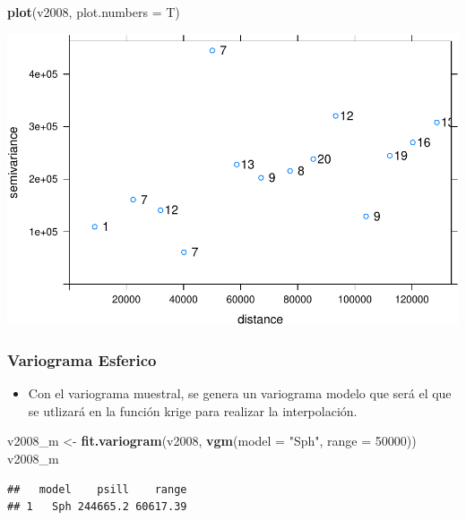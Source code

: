 \documentclass[11pt,]{article}
\newenvironment{Shaded}{\begin{snugshade}}{\end{snugshade}}
\newcommand{\KeywordTok}[1]{\textcolor[rgb]{0.13,0.29,0.53}{\textbf{#1}}}
\newcommand{\DataTypeTok}[1]{\textcolor[rgb]{0.13,0.29,0.53}{#1}}
\newcommand{\DecValTok}[1]{\textcolor[rgb]{0.00,0.00,0.81}{#1}}
\newcommand{\StringTok}[1]{\textcolor[rgb]{0.31,0.60,0.02}{#1}}
\newcommand{\NormalTok}[1]{#1}
\providecommand{\tightlist}{%
\setlength{\itemsep}{0pt}\setlength{\parskip}{0pt}}
\begin{document}
\begin{Shaded}
\begin{Highlighting}[]
\KeywordTok{plot}\NormalTok{(v2008, }\DataTypeTok{plot.numbers =}\NormalTok{ T)}
\end{Highlighting}
\end{Shaded}

\includegraphics{proyecto_files/figure-latex/unnamed-chunk-31-1.pdf}

\subsubsection{Variograma Esferico}\label{variograma-esferico}

\begin{itemize}
\tightlist
\item
  Con el variograma muestral, se genera un variograma modelo que será el
  que se utlizará en la función krige para realizar la interpolación.
\end{itemize}

\begin{Shaded}
\begin{Highlighting}[]
\NormalTok{v2008_m <-}\StringTok{ }\KeywordTok{fit.variogram}\NormalTok{(v2008, }\KeywordTok{vgm}\NormalTok{(}\DataTypeTok{model =} \StringTok{"Sph"}\NormalTok{, }\DataTypeTok{range =} \DecValTok{50000}\NormalTok{))}
\NormalTok{v2008_m}
\end{Highlighting}
\end{Shaded}

\begin{verbatim}
##   model    psill    range
## 1   Sph 244665.2 60617.39
\end{verbatim}
\end{document}
